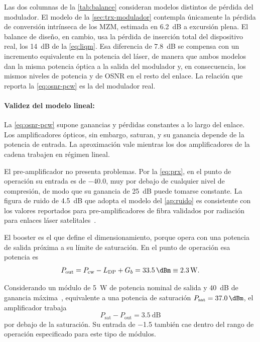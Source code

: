 Las dos columnas de la \cref{tab:balance} consideran modelos distintos de
p\'erdida del modulador. El modelo de la \cref{sec:trx-modulador} contempla
\'unicamente la p\'erdida de conversi\'on intr\'inseca de los MZM, estimada en
\SI{6.2}{\dB} a excursi\'on plena. El balance de dise\~no, en cambio, usa la
p\'erdida de inserci\'on total del dispositivo real, los \SI{14}{\dB} de la
\eqref{eq:liqm}. Esa diferencia de \SI{7.8}{\dB} se compensa con un incremento
equivalente en la potencia del l\'aser, de manera que ambos modelos dan la
misma potencia \'optica a la salida del modulador y, en consecuencia, los
mismos niveles de potencia y de OSNR en el resto del enlace. La relaci\'on que
reporta la \eqref{eq:osnr-pcw} es la del modulador real.

\paragraph{Validez del modelo lineal:}
La \eqref{eq:osnr-pcw} supone ganancias y p\'erdidas constantes a lo largo del
enlace. Los amplificadores \'opticos, sin embargo, saturan, y su ganancia
depende de la potencia de entrada. La aproximaci\'on vale mientras los dos
amplificadores de la cadena trabajen en r\'egimen lineal.

El pre-amplificador no presenta problemas. Por la \eqref{eq:prx}, en el punto
de operaci\'on su entrada es de \SI{-40.0}{\dBm}, muy por debajo de cualquier
nivel de compresi\'on, de modo que su ganancia de \SI{25}{\dB} puede tomarse
constante. La figura de ruido de \SI{4.5}{\dB} que adopta el modelo del
\cref{ap:ruido} es consistente con los valores reportados para
pre-amplificadores de fibra validados por radiaci\'on para enlaces l\'aser
satelitales~\cite{edmunds2017}.

El booster es el que define el dimensionamiento, porque opera con una potencia
de salida pr\'oxima a su l\'imite de saturaci\'on. En el punto de operaci\'on
esa potencia es
\begin{equation}
  P_{\mathrm{out}} = \Pcw - L_{\mathrm{DP}} + G_b = \SI{33.5}{\dBm}
                   \equiv \SI{2.3}{\watt}.
  \label{eq:pout-booster}
\end{equation}

Considerando un m\'odulo de \SI{5}{\watt} de potencia nominal de salida y
\SI{40}{\dB} de ganancia m\'axima~\cite{nuphoton}, equivalente a una potencia
de saturaci\'on $P_{\mathrm{sat}} = \SI{37.0}{\dBm}$, el amplificador trabaja
\begin{equation}
  P_{\mathrm{sat}} - P_{\mathrm{out}} = \SI{3.5}{\dB}
  \label{eq:backoff}
\end{equation}
por debajo de la saturaci\'on. Su entrada de \SI{-1.5}{\dBm} tambi\'en cae
dentro del rango de operaci\'on especificado para este tipo de m\'odulos.

